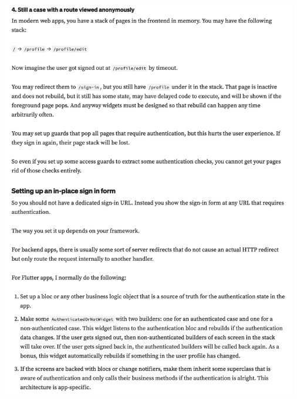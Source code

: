 \Continuing
\begin{center}
    \includegraphics[width=35em]{sign-in-routes-p3}
\end{center}
\WillContinue
\pagebreak

